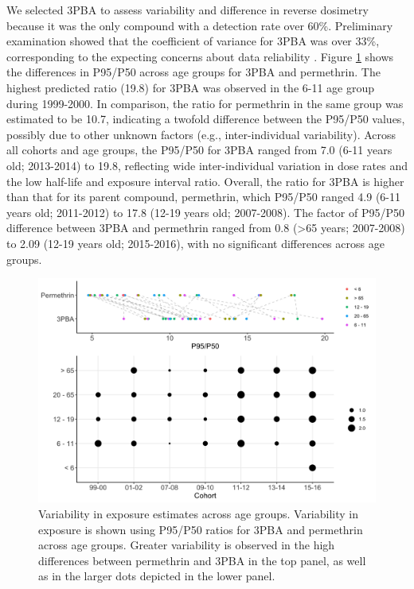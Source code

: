 \documentclass[toxics,article,submit,pdftex,moreauthors]{Definitions/mdpi}
\begin{document}
We selected 3PBA to assess variability and difference in reverse
dosimetry because it was the only compound with a detection rate over
60\%. Preliminary examination showed that the coefficient of variance
for 3PBA was over 33\%, corresponding to the expecting concerns about
data reliability \citep{faure_evaluation_2020}. Figure \ref{fig:fig5}
shows the differences in P95/P50 across age groups for 3PBA and
permethrin. The highest predicted ratio (19.8) for 3PBA was observed in
the 6-11 age group during 1999-2000. In comparison, the ratio for
permethrin in the same group was estimated to be 10.7, indicating a
twofold difference between the P95/P50 values, possibly due to other
unknown factors (e.g., inter-individual variability). Across all cohorts
and age groups, the P95/P50 for 3PBA ranged from 7.0 (6-11 years old;
2013-2014) to 19.8, reflecting wide inter-individual variation in dose
rates and the low half-life and exposure interval ratio. Overall, the
ratio for 3PBA is higher than that for its parent compound, permethrin,
which P95/P50 ranged 4.9 (6-11 years old; 2011-2012) to 17.8 (12-19
years old; 2007-2008). The factor of P95/P50 difference between 3PBA and
permethrin ranged from 0.8 (\textgreater65 years; 2007-2008) to 2.09
(12-19 years old; 2015-2016), with no significant differences across age
groups.

\begin{figure}[H]
\includegraphics[width=1\linewidth,]{figures/fig5} \caption{Variability in exposure estimates across age groups. Variability in exposure is shown using P95/P50 ratios for 3PBA and permethrin across age groups. Greater variability is observed in the high differences between permethrin and 3PBA in the top panel, as well as in the larger dots depicted in the lower panel.}\label{fig:fig5}
\end{figure}
\end{document}
